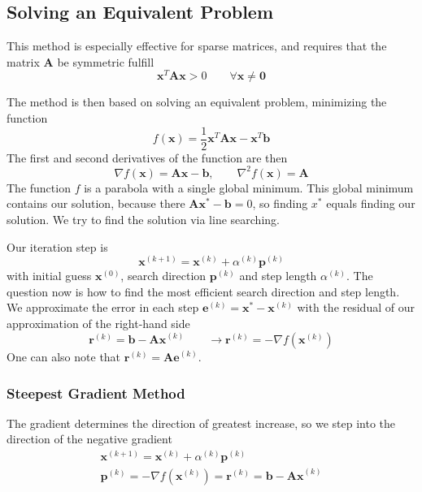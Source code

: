 \documentclass{article}
\begin{document}
\subsection{Solving an Equivalent Problem}
This method is especially effective for sparse matrices, and requires that the matrix $\bm{A}$ be symmetric fulfill
\begin{equation}
    \bm{x}^T \bm{Ax} > 0 \qquad \forall \bm{x} \neq \bm{0}
\end{equation}

The method is then based on solving an equivalent problem, minimizing the function
\begin{equation}
    f(\bm{x}) = \frac{1}{2} \bm{x}^T \bm{Ax} - \bm{x}^T \bm{b}
\end{equation}
The first and second derivatives of the function are then
\begin{equation}
    \nabla f(\bm{x}) = \bm{Ax} - \bm{b}, \qquad \nabla^2f(\bm{x}) = \bm{A}
\end{equation}
The function $f$ is a parabola with a single global minimum.
This global minimum contains our solution, because there $\bm{Ax^*} - \bm{b} = 0$, so finding $x^*$ equals finding our solution.
We try to find the solution via line searching.

Our iteration step is
\begin{equation}
    \bm{x}^{(k+1)} = \bm{x}^{(k)} + \alpha^{(k)} \bm{p}^{(k)}
\end{equation}
with initial guess $\bm{x}^{(0)}$, search direction $\bm{p}^{(k)}$ and step length $\alpha^{(k)}$.
The question now is how to find the most efficient search direction and step length.
We approximate the error in each step $\bm{e}^{(k)} = \bm{x}^* - \bm{x}^{(k)}$ with the residual of our approximation of the right-hand side
\begin{equation}
    \bm{r}^{(k)} = \bm{b} - \bm{Ax}^{(k)} \qquad \rightarrow \bm{r}^{(k)} = -\nabla f(\bm{x}^{(k)})
\end{equation}
One can also note that $\bm{r}^{(k)} = \bm{Ae}^{(k)}$.

\subsubsection{Steepest Gradient Method}
The gradient determines the direction of greatest increase, so we step into the direction of the negative gradient
\begin{gather}
    \bm{x}^{(k+1)} = \bm{x}^{(k)} + \alpha^{(k)}\bm{p}^{(k)}\\
    \bm{p}^{(k)} = -\nabla f(\bm{x}^{(k)}) = \bm{r}^{(k)} = \bm{b} - \bm{Ax}^{(k)}
\end{gather}
\end{document}
